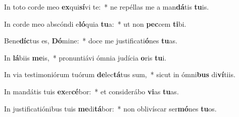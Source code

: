 \item In toto corde meo \textbf{ex}qui\textbf{sí}vi te:~* ne repéllas me a man\textbf{dá}tis \textbf{tu}is.
\item In corde meo abscóndi e\textbf{ló}quia \textbf{tu}a:~* ut non \textbf{pec}cem \textbf{ti}bi.
\item Bene\textbf{díc}tus es, \textbf{Dó}mine:~* doce me justificati\textbf{ó}nes \textbf{tu}as.
\item In \textbf{lá}biis \textbf{me}is,~* pronuntiávi ómnia judícia \textbf{o}ris \textbf{tu}i.
\item In via testimoniórum tuórum \textbf{de}lec\textbf{tá}tus sum,~* sicut in ómni\textbf{bus} di\textbf{ví}tiis.
\item In mandátis tuis \textbf{ex}er\textbf{cé}bor:~* et considerábo \textbf{vi}as \textbf{tu}as.
\item In justificatiónibus tuis \textbf{me}di\textbf{tá}bor:~* non oblivíscar ser\textbf{mó}nes \textbf{tu}os.
